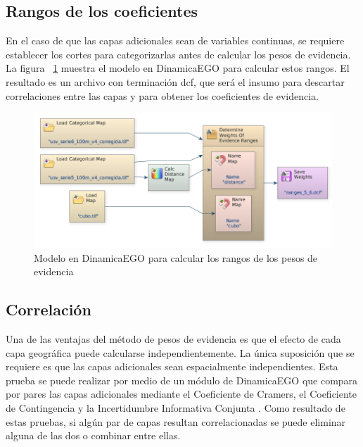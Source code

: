 \documentclass[12pt,a4paper,oldfontcommands]{article}
\begin{document}
\subsection{Rangos de los coeficientes}

 En el caso de que las capas adicionales sean de variables continuas, se requiere establecer los cortes para categorizarlas antes de calcular los pesos de evidencia. La figura ~\ref{fig:ranges} muestra el modelo en DinamicaEGO para calcular estos rangos. El resultado es un archivo con terminación dcf, que será el insumo para descartar correlaciones entre las capas y para obtener los coeficientes de evidencia.
 
\bigskip
\begin{figure}[H]
	\centering
	\includegraphics[width=1\textwidth]{./figuras/ranges.png}
	\caption{Modelo en DinamicaEGO para calcular los rangos de los pesos de evidencia}
	\label{fig:ranges}
\end{figure}
\subsection{Correlación}
Una de las ventajas del método de pesos de evidencia es que el efecto de cada capa geográfica puede calcularse independientemente. La única suposición que se requiere es que las capas adicionales sean espacialmente independientes. Esta prueba se puede realizar por medio de un módulo de DinamicaEGO que compara por pares las capas adicionales mediante el Coeficiente de Cramers, el Coeficiente de Contingencia y la Incertidumbre Informativa Conjunta \cite{cap8_1994}. Como resultado de estas pruebas, si algún par de capas resultan correlacionadas se puede eliminar alguna de las dos o combinar entre ellas.
 
\end{document}
